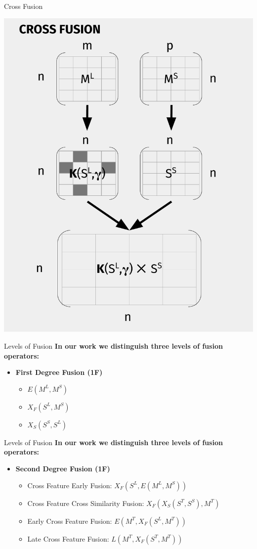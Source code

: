 \documentclass[10pt,xcolor=table]{beamer}
\begin{document}
\begin{frame}{Cross Fusion}
\begin{center}
\includegraphics[width=.55\linewidth]{image2/Chapitre3/xf_diag.pdf}
\end{center}
\end{frame}


\begin{frame}[t]{Levels of Fusion}
\large \textbf{In our work we distinguish three levels of fusion operators:} 
\vspace{.5cm}
\begin{itemize}
\item  \textbf{First Degree Fusion (1F)}
	\begin{itemize}
	\item $E(M^L, M^S)$
	\item $X_F(S^L, M^S)$
	\item $X_S(S^S, S^L)$
	\end{itemize}
\end{itemize}
\end{frame}

\begin{frame}[t]{Levels of Fusion}
\large \textbf{In our work we distinguish three levels of fusion operators:} 
\vspace{.5cm}
\begin{itemize}
\item  \textbf{Second Degree Fusion (1F)}
	\begin{itemize}
	\item Cross Feature Early Fusion: $X_F(S^L, E(M^L, M^S))$
	\item Cross Feature Cross Similarity Fusion: $X_F(X_S(S^T,S^S),M^T)$
	\item Early Cross Feature Fusion:  $E(M^T , X_F(S^L , M^T ))$
	\item Late Cross Feature Fusion: $L(M^T , X_F(S^T , M^T ))$
	\end{itemize}
\end{itemize}
\end{frame}
\end{document}

